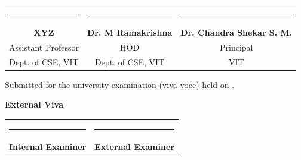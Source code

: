 \documentclass[12pt,a4paper]{article}
\begin{document}
	\begin{center}
		\begin{tabular}{c c c}
			\rule{4cm}{0.5mm} & \rule{4cm}{0.5mm} & \rule{5cm}{0.5mm} \\
			\textbf{XYZ} & \textbf{Dr. M Ramakrishna} & \textbf{Dr. Chandra Shekar S. M.}\\
			Assistant Professor & HOD  & Principal \\
			Dept. of CSE, VIT & Dept. of CSE, VIT & VIT\\	
		\end{tabular}
	\end{center}
\vspace{0.3in}
\noindent Submitted for the university examination (viva-voce) held on \underline{\hspace{3cm}}.
\vspace{0.42cm}
\begin{center}
\textbf{External Viva}

\begin{center}
\begin{tabular}{cc}
    \rule{4cm}{0.4pt} &  \hspace{5cm} \rule{4cm}{0.4pt} \\[-1pt]
    \textbf{Internal Examiner} &  \hspace{5cm} \textbf{External Examiner}
\end{tabular}
\end{center}

\end{center}
\end{document}
